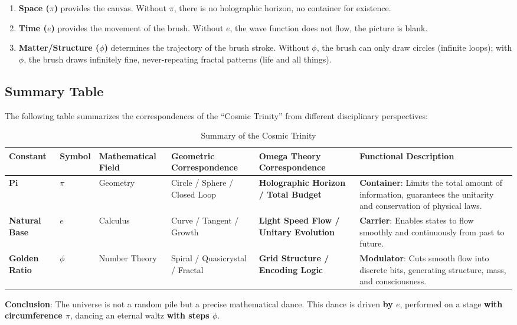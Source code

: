 \begin{enumerate}
\item \textbf{Space ($\pi$)} provides the canvas. Without $\pi$, there is no holographic horizon, no container for existence.
\item \textbf{Time ($e$)} provides the movement of the brush. Without $e$, the wave function does not flow, the picture is blank.
\item \textbf{Matter/Structure ($\phi$)} determines the trajectory of the brush stroke. Without $\phi$, the brush can only draw circles (infinite loops); with $\phi$, the brush draws infinitely fine, never-repeating fractal patterns (life and all things).
\end{enumerate}

\subsection{Summary Table}

The following table summarizes the correspondences of the ``Cosmic Trinity'' from different disciplinary perspectives:

\begin{table}[ht]
\centering
\small
\begin{tabularx}{\textwidth}{|p{1.2cm}|p{0.8cm}|p{1.5cm}|p{2.2cm}|p{2.5cm}|X|}
\hline
\textbf{Constant} & \textbf{Symbol} & \textbf{Mathematical Field} & \textbf{Geometric Correspondence} & \textbf{Omega Theory Correspondence} & \textbf{Functional Description} \\
\hline
\textbf{Pi} & $\pi$ & Geometry & Circle / Sphere / Closed Loop & \textbf{Holographic Horizon / Total Budget} & \textbf{Container}: Limits the total amount of information, guarantees the unitarity and conservation of physical laws. \\
\hline
\textbf{Natural Base} & $e$ & Calculus & Curve / Tangent / Growth & \textbf{Light Speed Flow / Unitary Evolution} & \textbf{Carrier}: Enables states to flow smoothly and continuously from past to future. \\
\hline
\textbf{Golden Ratio} & $\phi$ & Number Theory & Spiral / Quasicrystal / Fractal & \textbf{Grid Structure / Encoding Logic} & \textbf{Modulator}: Cuts smooth flow into discrete bits, generating structure, mass, and consciousness. \\
\hline
\end{tabularx}
\caption{Summary of the Cosmic Trinity}
\end{table}

\textbf{Conclusion}:
The universe is not a random pile but a precise mathematical dance.
This dance is driven \textbf{by $e$}, performed on a stage \textbf{with circumference $\pi$}, dancing an eternal waltz \textbf{with steps $\phi$}.
